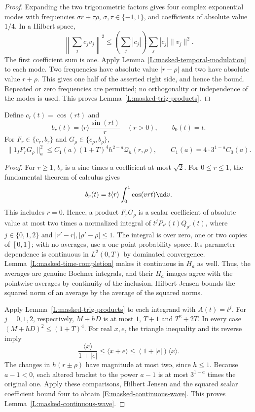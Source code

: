 \begin{proof}
  Expanding the two trigonometric factors gives four complex exponential
  modes with frequencies $\sigma r+\tau\rho$, $\sigma,\tau \in \{-1,1\}$,
  and coefficients of absolute value $1/4$. In a Hilbert space,
  \[
    \left\|\sum_j c_jv_j\right\|^2
    \le \left(\sum_j|c_j|\right)\sum_j|c_j|\|v_j\|^2.
  \]
  The first coefficient sum is one. Apply
  Lemma~\ref{L:masked-temporal-modulation} to each mode. Two frequencies
  have absolute value $|r-\rho|$ and two have absolute value $r+\rho$.
  This gives one half of the asserted right side, and hence the bound.
  Repeated or zero frequencies are permitted; no orthogonality or
  independence of the modes is used.
  This proves Lemma~\ref{L:masked-trig-products}.
\end{proof}

\begin{lemma}\label{L:masked-continuous-wave}
  Define $c_r(t) = \cos(rt)$ and
  \[
    b_r(t) = \langle r\rangle\frac{\sin(rt)}r\quad(r > 0),
    \qquad b_0(t) = t.
  \]
  For $F_r \in \{c_r,b_r\}$ and $G_\rho \in \{c_\rho,b_\rho\}$,
  \begin{equation}\label{E:masked-continuous-wave}
    \|1_IF_rG_\rho\|_a^2
    \le C_1(a)(1+T)^4h^{2-a}\mathcal Q_h(r,\rho),
    \qquad C_1(a) = 4\cdot3^{1-a}C_0(a).
  \end{equation}
\end{lemma}

\begin{proof}
  For $r \ge 1$, $b_r$ is a sine times a coefficient at most $\sqrt{2}$.
  For $0 \le r \le 1$, the fundamental theorem of calculus gives
  \[
    b_r(t) = t\langle r\rangle\int_0^1\cos(vrt)\ud v.
  \]
  This includes $r = 0$. Hence, a product $F_rG_\rho$ is a scalar
  coefficient of absolute value at most two times a normalized integral
  of $t^jP_{r'}(t)Q_{\rho'}(t)$, where $j \in \{0,1,2\}$ and
  $|r'-r|,|\rho'-\rho| \le 1$. The integral is over zero, one or two
  copies of $[0,1]$; with no averages, use a one-point probability space.
  Its parameter dependence is continuous in $L^2(0,T)$ by dominated
  convergence. Lemma~\ref{L:masked-time-completion} makes it continuous
  in $H_a$ as well. Thus, the averages are genuine Bochner integrals,
  and their $H_a$ images agree with the pointwise averages by continuity
  of the inclusion. Hilbert Jensen bounds the squared norm of an average
  by the average of the squared norms.

  Apply Lemma~\ref{L:masked-trig-products} to each integrand with $A(t)=t^j$.
  For $j = 0,1,2$, respectively, $M+hD$ is at most
  $1$, $T+1$ and $T^2+2T$. In every case $(M+hD)^2 \le (1+T)^4$.
  For real $x,e$, the triangle inequality and its reverse imply
  \[
    \frac{\langle x\rangle}{1+|e|}
    \le \langle x+e\rangle \le (1+|e|)\langle x\rangle.
  \]
  The changes in $h(r\pm\rho)$ have magnitude at most two, since $h \le 1$.
  Because $a-1 < 0$, each altered bracket to the power $a-1$ is at most
  $3^{1-a}$ times the original one. Apply these comparisons, Hilbert Jensen
  and the squared scalar coefficient bound four to obtain
  \eqref{E:masked-continuous-wave}.
  This proves Lemma~\ref{L:masked-continuous-wave}.
\end{proof}

